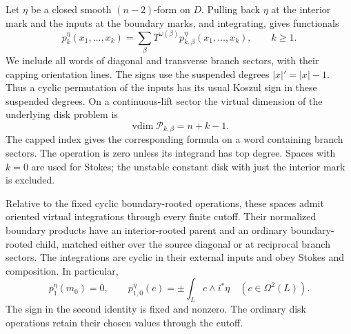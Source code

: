 Let $\eta$ be a closed smooth $(n-2)$-form on $D$.  Pulling back $\eta$
at the interior mark and the inputs at the boundary marks, and
integrating, gives functionals
\begin{equation}\label{curv:bulk-derivative}
 p_k^\eta(x_1,\ldots,x_k)
 =\sum_\beta T^{\omega(\beta)}p_{k,\beta}^\eta(x_1,\ldots,x_k),
 \qquad k\geq1.
\end{equation}
We include all words of diagonal and transverse branch sectors, with
their capping orientation lines.  The signs use the suspended degrees
$|x|'=|x|-1$.  Thus a cyclic permutation of the inputs has its usual
Koszul sign in these suspended degrees.  On a continuous-lift sector
the virtual dimension of the underlying disk problem is
\begin{equation}\label{curv:unmarked-dimension}
 \operatorname{vdim}\mathcal P_{k,\beta}=n+k-1.
\end{equation}
The capped index gives the corresponding formula on a word containing
branch sectors.  The operation is zero unless its integrand has top
degree.  Spaces with $k=0$ are used for Stokes; the unstable constant
disk with just the interior mark is excluded.

\begin{lemma}\label{curv:stokes}
Relative to the fixed cyclic boundary-rooted operations, these spaces
admit oriented virtual integrations through every finite cutoff.
Their normalized boundary products have an interior-rooted parent
and an ordinary boundary-rooted child, matched either over the source
diagonal or at reciprocal branch sectors.  The integrations are
cyclic in their external inputs and obey Stokes and composition.
In particular,
\begin{equation}\label{curv:pairing-identity}
 p_1^\eta(m_0)=0,
 \qquad
 p_{1,0}^\eta(c)=\pm\int_L c\wedge i^*\eta
 \quad(c\in\Omega^2(L)).
\end{equation}
The sign in the second identity is fixed and nonzero.  The ordinary
disk operations retain their chosen values through the cutoff.
\end{lemma}

